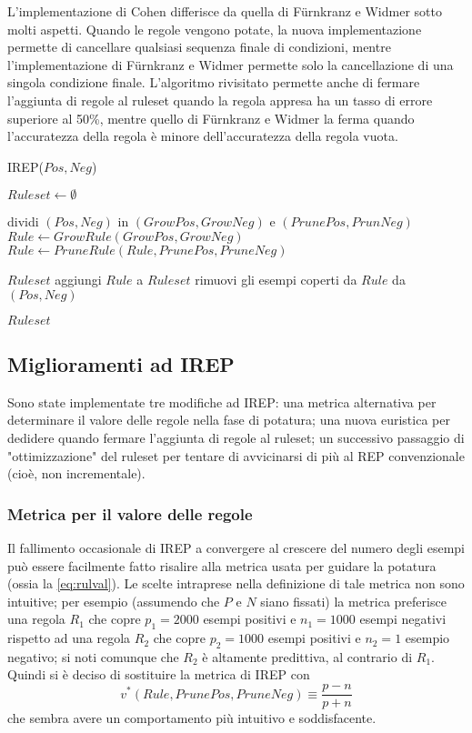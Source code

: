 L'implementazione di Cohen differisce da quella di Fürnkranz e Widmer sotto molti aspetti. Quando le regole vengono potate, la nuova implementazione permette di cancellare qualsiasi sequenza finale di condizioni, mentre l'implementazione di Fürnkranz e Widmer permette solo la cancellazione di una singola condizione finale. L'algoritmo rivisitato permette anche di fermare l'aggiunta di regole al ruleset quando la regola appresa ha un tasso di errore superiore al 50\%, mentre quello di Fürnkranz e Widmer la ferma quando l'accuratezza della regola è minore dell'accuratezza della regola vuota.

\begin{algorithm}[!htbp]
	\caption{IREP($Pos, Neg$)}
	\label{alg:irep}
	\begin{algorithmic}[1]
		\State $Ruleset \gets \emptyset$
		
		\State dividi $(Pos, Neg)$ in $(GrowPos, GrowNeg)$ e $(PrunePos, PrunNeg)$
		\State $Rule \gets GrowRule(GrowPos, GrowNeg)$
		\State $Rule \gets PruneRule(Rule, PrunePos, PruneNeg)$
		
		\State \Return $Ruleset$
		\Else
		\State aggiungi $Rule$ a $Ruleset$
		\State rimuovi gli esempi coperti da $Rule$ da $(Pos, Neg)$
		\EndIf
		\EndWhile
		
		\State \Return $Ruleset$
	\end{algorithmic}
\end{algorithm}

\pagebreak

\subsection{Miglioramenti ad IREP}
Sono state implementate tre modifiche ad IREP: una metrica alternativa per determinare il valore delle regole nella fase di potatura; una nuova euristica per dedidere quando fermare l'aggiunta di regole al ruleset; un successivo passaggio di "ottimizzazione" del ruleset per tentare di avvicinarsi di più al REP convenzionale (cioè, non incrementale).

\subsubsection*{Metrica per il valore delle regole}
Il fallimento occasionale di IREP a convergere al crescere del numero degli esempi può essere facilmente fatto risalire alla metrica usata per guidare la potatura (ossia la \eqref{eq:rulval}). Le scelte intraprese nella definizione di tale metrica non sono intuitive; per esempio (assumendo che $P$ e $N$ siano fissati) la metrica preferisce una regola $R_1$ che copre $p_1 = 2000$ esempi positivi e $n_1 = 1000$ esempi negativi rispetto ad una regola $R_2$ che copre $p_2 = 1000$ esempi positivi e $n_2 = 1$ esempio negativo; si noti comunque che $R_2$ è altamente predittiva, al contrario di $R_1$. Quindi si è deciso di sostituire la metrica di IREP con $$v^*(Rule, PrunePos, PruneNeg) \equiv \frac{p - n}{p + n}$$ che sembra avere un comportamento più intuitivo e soddisfacente.

